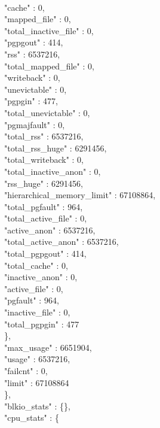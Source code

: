 \documentclass[11pt,final,oneside]{fithesis}
\begin{document}
\\           "cache" : 0,
\\           "mapped_file" : 0,
\\           "total_inactive_file" : 0,
\\           "pgpgout" : 414,
\\           "rss" : 6537216,
\\           "total_mapped_file" : 0,
\\           "writeback" : 0,
\\           "unevictable" : 0,
\\           "pgpgin" : 477,
\\           "total_unevictable" : 0,
\\           "pgmajfault" : 0,
\\           "total_rss" : 6537216,
\\           "total_rss_huge" : 6291456,
\\           "total_writeback" : 0,
\\           "total_inactive_anon" : 0,
\\           "rss_huge" : 6291456,
\\           "hierarchical_memory_limit" : 67108864,
\\           "total_pgfault" : 964,
\\           "total_active_file" : 0,
\\           "active_anon" : 6537216,
\\           "total_active_anon" : 6537216,
\\           "total_pgpgout" : 414,
\\           "total_cache" : 0,
\\           "inactive_anon" : 0,
\\           "active_file" : 0,
\\           "pgfault" : 964,
\\           "inactive_file" : 0,
\\           "total_pgpgin" : 477
\\        \},
\\        "max_usage" : 6651904,
\\        "usage" : 6537216,
\\        "failcnt" : 0,
\\        "limit" : 67108864
\\     \},
\\     "blkio_stats" : \{\},
\\     "cpu_stats" : \{
\end{document}
